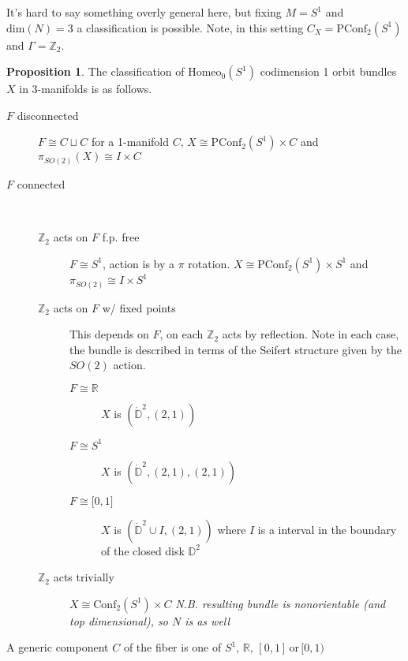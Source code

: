 \documentclass[10pt, oneside]{article}
\newcommand{\R}{\mathbb{R}}
\newcommand{\Z}{\mathbb{Z}}
\newcommand{\homeo}[1][S^1]{\text{Homeo}_0(#1)}
\newcommand{\conf}[2][S^1]{\text{Conf}_{#2}(#1)}
\newcommand{\pconf}[2][S^1]{\text{PConf}_{#2}(#1)}
\theoremstyle{definition}
\newtheorem{prop}{Proposition}[section]
\theoremstyle{definition}
\begin{document}
It's hard to say something overly general here, 
but fixing $M = S^1$ 
and $\text{dim}(N)=3$ a classification is possible. 
Note, in this setting $C_X = \pconf{2}$ and $\Gamma = \Z_2$.

\begin{prop}
    The classification of $\homeo$ codimension 1 orbit bundles $X$ in 3-manifolds is as follows. 
    \begin{description}
        \item[$F$ disconnected] $F\cong C\sqcup C$ for a 1-manifold $C$, $X\cong \pconf{2}\times C$ and $\pi_{SO(2)}(X) \cong I \times C$
        \item[$F$ connected] \ 
        \begin{description}
            \item[$\Z_2$ acts on $F$ f.p. free] $F\cong S^1$, action is by a $\pi$ rotation. $X\cong \pconf{2} \times S^1$ and $\pi_{SO(2)} \cong I\times S^1$
            \item[$\Z_2$ acts on $F$ w/ fixed points] This depends on $F$, on each $\Z_2$ acts by reflection. Note in each case, the bundle is described in terms of the Seifert structure given by the $SO(2)$ action.
            \begin{description}
                \item[$F\cong \R$] $X$ is $(\mathring{\mathbb{D}}^2, (2, 1))$
                \item[$F\cong S^1$] $X$ is $(\mathring{\mathbb{D}}^2, (2, 1), (2,1))$
                \item[$F \cong \lbrack 0,1\rbrack$] $X$ is $(\mathring{\mathbb{D}}^2\cup I, (2,1))$ where $I$ is a interval in the boundary of the closed disk $\mathbb{D}^2$
            \end{description}
            \item[$\Z_2$ acts trivially] $X\cong\conf{2}\times C$ {\it N.B. resulting bundle is nonorientable (and top dimensional), so $N$ is as well} 
        \end{description}
    \end{description}
    A generic component $C$ of the fiber is one of $S^1,\, \mathbb{R},\, [0,1]\, \text{or}\,  [0,1)$
\end{prop}
\end{document}
